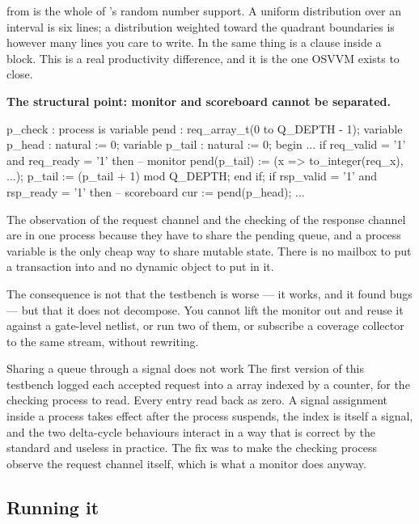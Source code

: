  from  is the whole of \VHDL{}'s random
number support. A uniform distribution over an interval is six lines; a
distribution weighted toward the quadrant boundaries is however many lines you
care to write. In \SV{} the same thing is a  clause inside a
 block. This is a real productivity difference, and it is the
one OSVVM exists to close.

\textbf{The structural point: monitor and scoreboard cannot be separated.}

\begin{vhdlcode}
p_check : process is
  variable pend   : req_array_t(0 to Q_DEPTH - 1);
  variable p_head : natural := 0;
  variable p_tail : natural := 0;
begin
  ...
  if req_valid = '1' and req_ready = '1' then       -- monitor
    pend(p_tail) := (x => to_integer(req_x), ...);
    p_tail := (p_tail + 1) mod Q_DEPTH;
  end if;
  if rsp_valid = '1' and rsp_ready = '1' then       -- scoreboard
    cur := pend(p_head);
    ...
\end{vhdlcode}

The observation of the request channel and the checking of the response
channel are in one process because they have to share the pending queue, and
a \VHDL{} process variable is the only cheap way to share mutable state. There
is no mailbox to put a transaction into and no dynamic object to put in it.

The consequence is not that the testbench is worse --- it works, and it found
bugs --- but that it does not decompose. You cannot lift the monitor out and
reuse it against a gate-level netlist, or run two of them, or subscribe a
coverage collector to the same stream, without rewriting.

\begin{gotcha}{Sharing a queue through a signal does not work}
The first version of this testbench logged each accepted request into a
 array indexed by a counter, for the checking process to read.
Every entry read back as zero. A signal assignment inside a process takes
effect after the process suspends, the index is itself a signal, and the two
delta-cycle behaviours interact in a way that is correct by the standard and
useless in practice. The fix was to make the checking process observe the
request channel itself, which is what a \SV{} monitor does anyway.
\end{gotcha}

\subsection{Running it}

